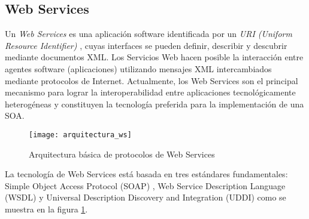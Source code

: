 \subsection{Web Services }
\label{MarcoConceptual:WS}
Un \emph{Web Services} es una aplicación software identificada por un \emph{URI (Uniform Resource Identifier)} \cite{WS:definiciones}, cuyas interfaces se pueden definir, describir y descubrir mediante documentos XML. Los Servicios Web hacen posible la interacción entre agentes software (aplicaciones) utilizando mensajes XML intercambiados mediante protocolos de Internet.
Actualmente, los Web Services son el principal mecanismo para lograr la interoperabilidad
entre aplicaciones tecnológicamente heterogéneas y constituyen la tecnología preferida para
la implementación de una SOA\cite{WS:definiciones}.
  \begin{figure}[h]
    \centering
    \texttt{[image: arquitectura\_ws]}
    \caption{Arquitectura básica de protocolos de Web Services}
    \label{figura:arquitectura_ws}
  \end{figure}
La tecnología de Web Services está basada en tres estándares fundamentales: Simple Object
Access Protocol (SOAP) , Web Service Description Language (WSDL) y Universal
Description Discovery and Integration (UDDI) como se muestra en la figura \ref{figura:arquitectura_ws}.
